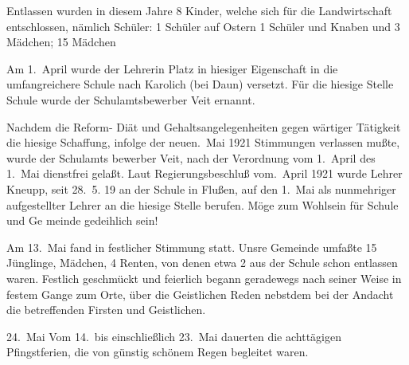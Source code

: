 

\pstart
Entlassen wurden in diesem Jahre 8 Kinder, welche sich für\ob
die Landwirtschaft entschlossen, nämlich Schüler: 1\ob
Schüler auf Ostern 1 Schüler und Knaben und 3 Mädchen; 15 Mädchen

\pend
{}
\pstart

Am 1.\ April wurde der Lehrerin Platz in\ob
hiesiger Eigenschaft in die umfangreichere Schule nach\ob
Karolich\unsicher{} (bei Daun) versetzt.  Für die hiesige Stelle\ob
Schule wurde der Schulamtsbewerber Veit ernannt.

Nachdem die Reform- Diät und Gehaltsangelegenheiten gegen\ohb
wärtiger Tätigkeit die hiesige Schaffung, infolge der neuen.\ Mai 1921  Stimmungen verlassen mußte, wurde der Schulamts\ohb
bewerber Veit, nach der Verordnung vom 1.\ April\ob
des 1.\ Mai dienstfrei gelaßt. Laut Regierungsbeschluß vom.\ April 1921 wurde Lehrer Kneupp, seit 28.\ 5. 19\unsicher{} an\ob
der Schule in Flußen\unsicher, auf den 1.\ Mai als nunmehriger\ob
aufgestellter Lehrer an die hiesige Stelle berufen.\ob
Möge zum Wohlsein\unsicher{} für Schule und Ge\ohb
meinde gedeihlich sein!

Am 13.\ Mai fand in festlicher Stimmung statt.\ob
Unsre Gemeinde umfaßte 15 Jünglinge, Mädchen, 4 Renten\unsicher, von denen etwa 2 aus der\ob
Schule schon entlassen waren. Festlich geschmückt\ob
und feierlich begann\unsicher{} geradewegs nach seiner Weise\unsicher\ob
in festem Gange zum Orte, über die Geistlichen\ob
Reden nebstdem bei der Andacht die betreffenden\ob
Firsten und Geistlichen\unsicher.

24.\ Mai  Vom 14.\ bis einschließlich 23.\ Mai dauerten\ob
die achttägigen Pfingstferien, die von günstig\ob
schönem Regen begleitet waren.
\pend
